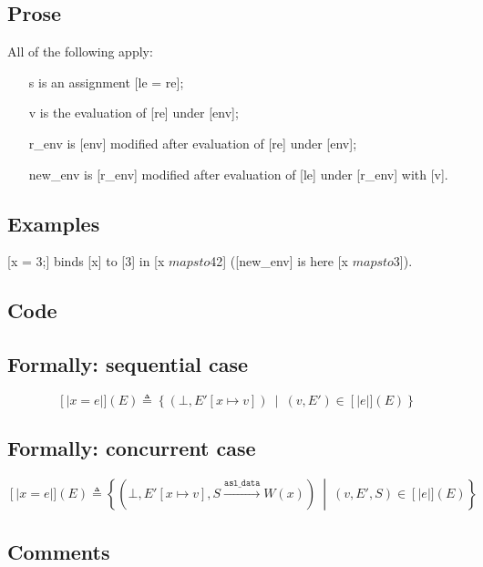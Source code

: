\documentclass{book}
\newcommand\llbracket{[|}
\newcommand\rrbracket{|]}
\newcommand\interp[1]{\left\llbracket #1 \right\rrbracket}
\newcommand\st[0]{\ \middle|\ }
\newcommand\asldata[0]{\mathtt{asl\_data}}
\begin{document}
  \subsection{Prose}
  All of the following apply:
  \begin{itemize}
  \item [s] is an assignment [le = re];
  \item [v] is the evaluation of [re] under [env];
  \item [r\_env] is [env] modified after evaluation of [re] under [env];
  \item [new\_env] is [r\_env] modified after evaluation of [le] under [r\_env] with
    [v].
  \end{itemize}

  \subsection{Examples}
  [x = 3;] binds [x] to [3] in [x $mapsto$42] ([new\_env] is here [x $mapsto$3]).

  \subsection{Code}

  \subsection{Formally: sequential case}
  \begin{equation}
    \interp{x = e} (E) \triangleq
      \left\{ \left(\bot, E'[x \mapsto v ]\right) \st{} (v, E') \in \interp{e} (E) \right\}
    \label{eq:sem-seq-sassign}
  \end{equation}

  \subsection{Formally: concurrent case}
  \begin{equation}
    \interp{x = e} (E) \triangleq
      \left\{ \left(\bot, E'[x \mapsto v ], S \xrightarrow{\asldata} W(x)\right) \st{}
        (v, E', S) \in \interp{e} (E)
      \right\}
    \label{eq:sem-conc-sassign}
  \end{equation}

  \subsection{Comments}
\end{document}
